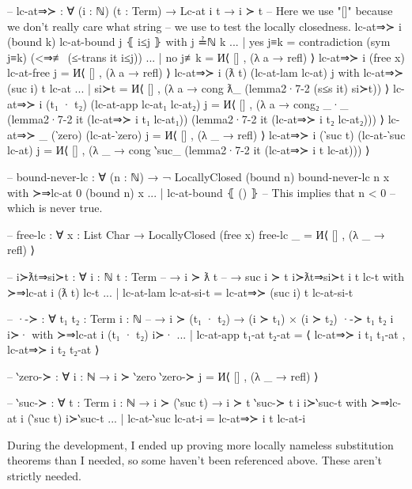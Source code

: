 \documentclass[logo,bsc,singlespacing,parskip,online]{infthesis}
\renewenvironment{code}{\mintedcopy[breaklines,breaksymbolleft=\;]{agda}}{\endmintedcopy}
\begin{document}
\begin{code}
-- lc-at⇒≻ : ∀ (i : ℕ) (t : Term) → Lc-at i t → i ≻ t
-- Here we use "[]" because we don't really care what string
-- we use to test the locally closedness.
lc-at⇒≻ i (bound k) lc-at-bound j ⦃ i≤j ⦄ with j ≟ℕ k
... | yes j≡k = contradiction (sym j≡k) (<⇒≢ (≤-trans it i≤j))
... | no  j≢k = И⟨ [] , (λ a → refl) ⟩
lc-at⇒≻ i (free x) lc-at-free j = И⟨ [] , (λ a → refl) ⟩
lc-at⇒≻ i (ƛ t) (lc-at-lam lc-at) j
  with lc-at⇒≻ (suc i) t lc-at
... | si≻t = И⟨ [] , (λ a → cong ƛ_ (lemma2·7-2 (s≤s it) si≻t)) ⟩
lc-at⇒≻ i (t₁ · t₂) (lc-at-app lc-at₁ lc-at₂) j =
  И⟨ []
  , (λ a → cong₂ _·_
      (lemma2·7-2 it (lc-at⇒≻ i t₁ lc-at₁))
      (lemma2·7-2 it (lc-at⇒≻ i t₂ lc-at₂))) ⟩
lc-at⇒≻ _ (‵zero) (lc-at-‵zero) j = И⟨ [] , (λ _ → refl) ⟩
lc-at⇒≻ i (‵suc t) (lc-at-‵suc lc-at) j =
  И⟨ []
  , (λ _ → cong ‵suc_ (lemma2·7-2 it (lc-at⇒≻ i t lc-at))) ⟩

-- bound-never-lc : ∀ (n : ℕ) → ¬ LocallyClosed (bound n)
bound-never-lc n x with ≻⇒lc-at 0 (bound n) x
... | lc-at-bound ⦃ () ⦄ -- This implies that n < 0
                         -- which is never true.

-- free-lc : ∀ {x : List Char} → LocallyClosed (free x)
free-lc _ = И⟨ [] , (λ _ → refl) ⟩

-- i≻ƛt⇒si≻t : ∀ {i : ℕ} {t : Term}
--   → i ≻ ƛ t
--   → suc i ≻ t
i≻ƛt⇒si≻t {i} {t} lc-t with ≻⇒lc-at i (ƛ t) lc-t
... | lc-at-lam lc-at-si-t = lc-at⇒≻ (suc i) t lc-at-si-t

-- ·-≻ : ∀ {t₁ t₂ : Term} {i : ℕ}
--   → i ≻ (t₁ · t₂) → (i ≻ t₁) × (i ≻ t₂)
·-≻ {t₁} {t₂} {i} i≻· with ≻⇒lc-at i (t₁ · t₂) i≻·
... | lc-at-app t₁-at t₂-at =
  ⟨ lc-at⇒≻ i t₁ t₁-at
  , lc-at⇒≻ i t₂ t₂-at ⟩

-- ‵zero-≻ : ∀ {i : ℕ} → i ≻ ‵zero
‵zero-≻ j = И⟨ [] , (λ _ → refl) ⟩

-- ‵suc-≻ : ∀ {t : Term} {i : ℕ} → i ≻ (‵suc t) → i ≻ t
‵suc-≻ {t} {i} i≻‵suc-t with ≻⇒lc-at i (‵suc t) i≻‵suc-t
... | lc-at-‵suc lc-at-i = lc-at⇒≻ i t lc-at-i
\end{code}

During the development, I ended up proving more locally nameless substitution theorems than I
needed, so some haven't been referenced above. These aren't strictly needed.
\end{document}
